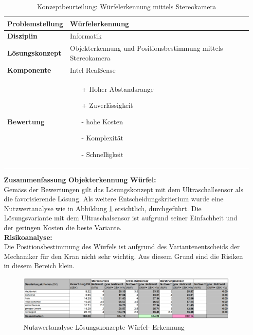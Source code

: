 \documentclass[../../../main.tex]{subfiles}
\begin{document}
    \begin{flushleft}
        \begin{table}[H]
        \begin{tabular}{ | l | p{11cm} |}
        \hline
        \textbf{Problemstellung} & Würfelerkennung \\ \hline
        \textbf{Disziplin} & Informatik \\ \hline
        \textbf{Lösungskonzept} & Objekterkennung und Positionsbestimmung mittels Stereokamera \\ \hline
        \textbf{Komponente} & Intel RealSense \\ \hline
        \textbf{Bewertung} &  \begin{itemize}
                                \item[+] Hoher Abstandsrange
                                \item[+] Zuverlässigkeit
                                \item[-] hohe Kosten 
                                \item[-] Komplexität
                                \item[-] Schnelligkeit   
                              \end{itemize} \\ \hline
        \end{tabular}
        \caption{Konzeptbeurteilung: Würfelerkennung mittels Stereokamera}
        \label{tab:konzept_wurfel_Stereokamera}
    \end{table}
    \end{flushleft}


    \textbf{Zusammenfassung Objekterkennung Würfel:}\\
    Gemäss der Bewertungen gilt das Lösungskonzept mit dem Ultraschallsensor als die favorisierende Lösung. Als weitere Entscheidungskriterium wurde eine Nutzwertanalyse wie in Abbildung \ref{fig:nutzwer_wurfel} ersichtlich, durchgeführt. Die Lösungsvariante mit dem Ultraschalsensor ist aufgrund seiner Einfachheit und der geringen Kosten die beste Variante.\\ 
    \textbf{Risikoanalyse:}\\
    Die Positionsbestimmung des Würfels ist aufgrund des Variantenentscheids der Mechaniker für den Kran nicht sehr wichtig. Aus diesem Grund sind die Risiken in diesem Bereich klein.\\

    \begin{figure}[H]
        \centering
        \includegraphics[width=1\textwidth]{Nutzwert_wurfel.png}
        \caption{Nutzwertanalyse Lösungskonzepte Würfel- Erkennung}
        \label{fig:nutzwer_wurfel}
    \end{figure}
\end{document}
